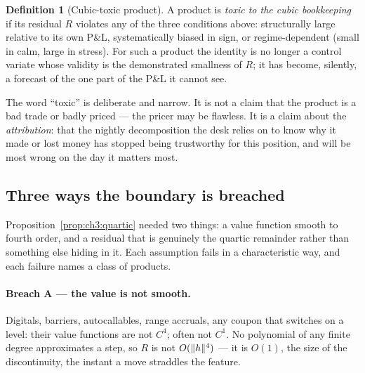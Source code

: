 \documentclass[11pt]{book}
\theoremstyle{plain}
\theoremstyle{definition}
\newtheorem{definition}[theorem]{Definition}
\theoremstyle{remark}
\DeclarePairedDelimiter{\norm}{\lVert}{\rVert}
\begin{document}
\begin{definition}[Cubic-toxic product]\label{def:ch3:toxic}
A product is \emph{toxic to the cubic bookkeeping} if its residual $R$
violates any of the three conditions above: structurally large relative to its
own P\&L, systematically biased in sign, or regime-dependent (small in calm,
large in stress). For such a product the identity is no longer a control
variate whose validity is the demonstrated smallness of $R$; it has become,
silently, a forecast of the one part of the P\&L it cannot see.
\end{definition}

The word ``toxic'' is deliberate and narrow. It is not a claim that the product
is a bad trade or badly priced --- the pricer may be flawless. It is a claim
about the \emph{attribution}: that the nightly decomposition the desk relies on
to know why it made or lost money has stopped being trustworthy for this
position, and will be most wrong on the day it matters most.

\subsection{Three ways the boundary is breached}\label{sec:ch3:breaches}

Proposition~\ref{prop:ch3:quartic} needed two things: a value function smooth
to fourth order, and a residual that is genuinely the quartic remainder rather
than something else hiding in it. Each assumption fails in a characteristic
way, and each failure names a class of products.

\paragraph{Breach A --- the value is not smooth.}
Digitals, barriers, autocallables, range accruals, any coupon that switches on
a level: their value functions are not $C^4$; often not $C^1$. No polynomial of
any finite degree approximates a step, so $R$ is not $O(\norm{h}^4)$ --- it is
$O(1)$, the size of the discontinuity, the instant a move straddles the feature.
\end{document}
